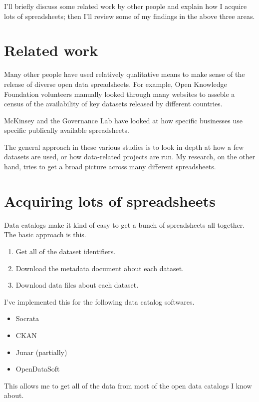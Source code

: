 \documentclass{acm_proc_article-sp}
\begin{document}
I'll briefly discuss some related work by other people and explain how I
acquire lots of spreadsheets; then I'll review some of my findings in the
above three areas.

\section{Related work}
Many other people have used relatively qualitative means to make sense of
the release of diverse open data spreadsheets.
For example, Open Knowledge Foundation volunteers manually looked through
many websites to asseble a census\cite{open-data-census}
of the availability of key datasets released by different countries.

McKinsey\cite{mckinsey} and the Governance Lab\cite{govlab}\cite{joel}
have looked at how specific businesses use specific publically available spreadsheets.

The general approach in these various studies is to look in depth at how a
few datasets are used, or how data-related projects are run. My research,
on the other hand, tries to get a broad picture across many different spreadsheets.

\section{Acquiring lots of spreadsheets}
Data catalogs make it kind of easy to get a bunch of spreadsheets all together.
The basic approach is this.

\begin{enumerate}
\item Get all of the dataset identifiers.
\item Download the metadata document about each dataset.
\item Download data files about each dataset.
\end{enumerate}

I've implemented this for the following data catalog softwares.

\begin{itemize}
\item Socrata
\item CKAN
\item Junar (partially)
\item OpenDataSoft
\end{itemize}

This allows me to get all of the data from most of the open data catalogs I know about.
\end{document}
